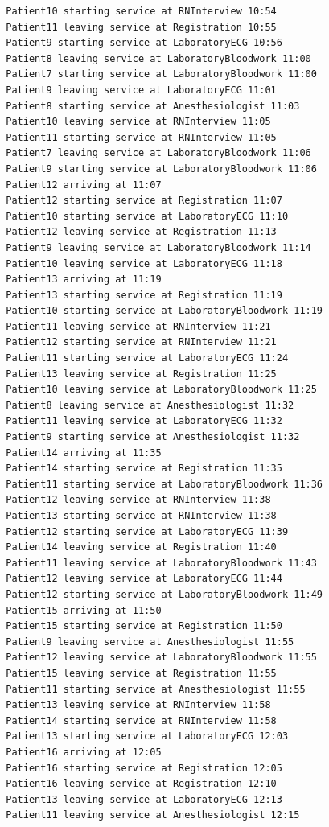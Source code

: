 \documentclass[12pt]{article}
\begin{document}
\begin{verbatim}
		Patient10 starting service at RNInterview 10:54
		Patient11 leaving service at Registration 10:55
		Patient9 starting service at LaboratoryECG 10:56
		Patient8 leaving service at LaboratoryBloodwork 11:00
		Patient7 starting service at LaboratoryBloodwork 11:00
		Patient9 leaving service at LaboratoryECG 11:01
		Patient8 starting service at Anesthesiologist 11:03
		Patient10 leaving service at RNInterview 11:05
		Patient11 starting service at RNInterview 11:05
		Patient7 leaving service at LaboratoryBloodwork 11:06
		Patient9 starting service at LaboratoryBloodwork 11:06
		Patient12 arriving at 11:07
		Patient12 starting service at Registration 11:07
		Patient10 starting service at LaboratoryECG 11:10
		Patient12 leaving service at Registration 11:13
		Patient9 leaving service at LaboratoryBloodwork 11:14
		Patient10 leaving service at LaboratoryECG 11:18
		Patient13 arriving at 11:19
		Patient13 starting service at Registration 11:19
		Patient10 starting service at LaboratoryBloodwork 11:19
		Patient11 leaving service at RNInterview 11:21
		Patient12 starting service at RNInterview 11:21
		Patient11 starting service at LaboratoryECG 11:24
		Patient13 leaving service at Registration 11:25
		Patient10 leaving service at LaboratoryBloodwork 11:25
		Patient8 leaving service at Anesthesiologist 11:32
		Patient11 leaving service at LaboratoryECG 11:32
		Patient9 starting service at Anesthesiologist 11:32
		Patient14 arriving at 11:35
		Patient14 starting service at Registration 11:35
		Patient11 starting service at LaboratoryBloodwork 11:36
		Patient12 leaving service at RNInterview 11:38
		Patient13 starting service at RNInterview 11:38
		Patient12 starting service at LaboratoryECG 11:39
		Patient14 leaving service at Registration 11:40
		Patient11 leaving service at LaboratoryBloodwork 11:43
		Patient12 leaving service at LaboratoryECG 11:44
		Patient12 starting service at LaboratoryBloodwork 11:49
		Patient15 arriving at 11:50
		Patient15 starting service at Registration 11:50
		Patient9 leaving service at Anesthesiologist 11:55
		Patient12 leaving service at LaboratoryBloodwork 11:55
		Patient15 leaving service at Registration 11:55
		Patient11 starting service at Anesthesiologist 11:55
		Patient13 leaving service at RNInterview 11:58
		Patient14 starting service at RNInterview 11:58
		Patient13 starting service at LaboratoryECG 12:03
		Patient16 arriving at 12:05
		Patient16 starting service at Registration 12:05
		Patient16 leaving service at Registration 12:10
		Patient13 leaving service at LaboratoryECG 12:13
		Patient11 leaving service at Anesthesiologist 12:15

\end{verbatim}
\end{document}
